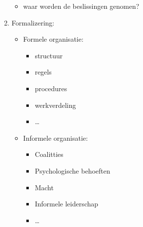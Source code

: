 \documentclass[12pt]{article}
\begin{document}
\begin{enumerate}
\begin{itemize}
        \item waar worden de beslissingen genomen?
    \end{itemize}
    \item Formalizering:\begin{itemize}
        \item Formele organisatie:\begin{itemize}
            \item structuur
            \item regels
            \item procedures
            \item werkverdeling
            \item \dots
        \end{itemize}
        \item Informele organisatie:\begin{itemize}
            \item Coalitties
            \item Psychologische behoeften
            \item Macht 
            \item Informele leiderschap 
            \item \dots
        \end{itemize}
    \end{itemize}
\end{enumerate}
\end{document}
